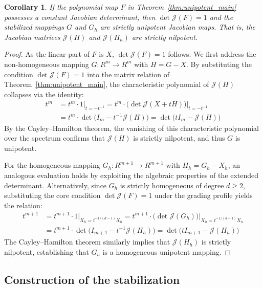 \documentclass[11pt,a4paper]{article}
\newtheorem{corollary}[theorem]{Corollary}
\begin{document}
\begin{corollary}
\label{cor:unipotent_determinant}
If the polynomial map $F$ in Theorem~\ref{thm:unipotent_main} possesses a constant Jacobian determinant, then $\det \mathcal{J}(F) = 1$ and the stabilized mappings $G$ and $G_h$ are strictly unipotent Jacobian maps. That is, the Jacobian matrices $\mathcal{J}(H)$ and $\mathcal{J}(H_h)$ are strictly nilpotent.
\end{corollary}

\begin{proof}
As the linear part of $F$ is $X$, $\det \mathcal{J}(F) = 1$ follows. We first address the non-homogeneous mapping $G: R^m \to R^m$ with $H = G - X$. By substituting the condition $\det \mathcal{J}(F) = 1$ into the matrix relation of Theorem~\ref{thm:unipotent_main}, the characteristic polynomial of $\mathcal{J}(H)$ collapses via the identity:
\begin{align}
t^m &= t^m \cdot 1\big|_{t = -t^{-1}} = t^m \cdot \big(\det \mathcal{J}(X + tH)\big)\big|_{t=-t^{-1}} \nonumber \\
&= t^m \cdot \det \big(I_m - t^{-1}\mathcal{J}(H)\big) = \det \big(t I_m - \mathcal{J}(H)\big)
\end{align}
By the Cayley--Hamilton theorem, the vanishing of this characteristic polynomial over the spectrum confirms that $\mathcal{J}(H)$ is strictly nilpotent, and thus $G$ is unipotent.

For the homogeneous mapping $G_h: R^{m+1} \to R^{m+1}$ with $H_h = G_h - X_h$, an analogous evaluation holds by exploiting the algebraic properties of the extended determinant. Alternatively, since $G_h$ is strictly homogeneous of degree $d \ge 2$, substituting the core condition $\det \mathcal{J}(F) = 1$ under the grading profile yields the relation:
\begin{align}
t^{m+1} &= t^{m+1} \cdot 1\big|_{X_h = t^{-1/(d-1)} X_h} = t^{m+1} \cdot \big(\det \mathcal{J}(G_h)\big)\big|_{X_h = t^{-1/(d-1)} X_h} \nonumber \\
&= t^{m+1} \cdot \det \big(I_{m+1} - t^{-1}\mathcal{J}(H_h)\big) = \det \big(t I_{m+1} - \mathcal{J}(H_h)\big)
\end{align}
The Cayley--Hamilton theorem similarly implies that $\mathcal{J}(H_h)$ is strictly nilpotent, establishing that $G_h$ is a homogeneous unipotent mapping.
\end{proof}

\subsection{Construction of the stabilization}
\end{document}
